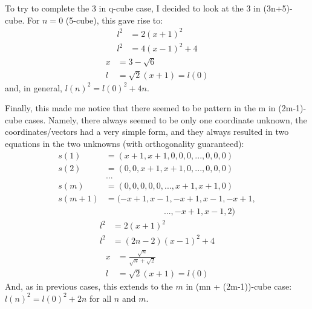 \documentclass[superscriptaddress,reprint,amsmath,amssymb,aps]{revtex4-1}
\begin{document}
To try to complete the 3 in q-cube case, I decided to look at the 3 in
(3n+5)-cube.  For $n=0$ (5-cube), this gave rise to:
\begin{align*}
     l^2 & = 2(x+1)^2     \\
     l^2 & = 4(x-1)^2 + 4
\end{align*}
\begin{align*}
     x & = 3 - \sqrt{6}         \\
     l & = \sqrt{2}(x+1) = l(0)
\end{align*}
and, in general, $l(n)^2 = l(0)^2 + 4n$.

Finally, this made me notice that there seemed to be pattern in the m in
(2m-1)-cube cases.  Namely, there always seemed to be only one
coordinate unknown, the coordinates/vectors had a very simple form, and
they always resulted in two equations in the two unknowns (with
orthogonality guaranteed):
\begin{align*}
     s(1)   & = ( x+1, x+1,    0,   0,    0, ...,    0,   0, 0) \\
     s(2)   & = (   0,   0,  x+1, x+1,    0, ...,    0,   0, 0) \\
            & ...                                               \\
     s(m)   & = (   0,   0,    0,   0,    0, ...,  x+1, x+1, 0) \\
     s(m+1) & = (-x+1, x-1, -x+1, x-1, -x+1,                    \\
            & ~~~~~~~~~~~~~~~~~~~~~~~~~~~~~~~..., -x+1, x-1, 2)
\end{align*}
\begin{align*}
     l^2 & =     2 (x+1)^2     \\
     l^2 & = (2n-2)(x-1)^2 + 4
\end{align*}
\begin{align*}
     x & = \frac{\sqrt{n}}{\sqrt{n}+\sqrt{2}} \\
     l & = \sqrt{2}(x+1) = l(0)
\end{align*}
And, as in previous cases, this extends to the $m$ in (mn + (2m-1))-cube
case:  $l(n)^2 = l(0)^2 + 2n$ for all $n$ and $m$.
\end{document}
